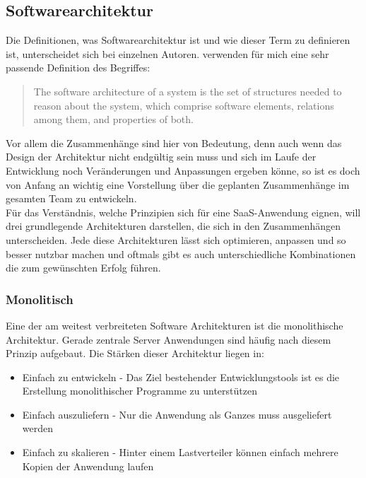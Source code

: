 \subsection{Softwarearchitektur}
Die Definitionen, was Softwarearchitektur ist und wie dieser Term zu definieren ist, unterscheidet sich bei einzelnen Autoren. \citet*[S. 4]{Bass.2013} verwenden für mich eine sehr passende Definition des Begriffes:
	\begin{quote} 
	The software architecture of a system is the set of structures needed to reason about the system, which comprise software elements, relations among them, and properties of both.
	 \end{quote}
Vor allem die Zusammenhänge sind hier von Bedeutung, denn auch wenn das Design der Architektur nicht endgültig sein muss und sich im Laufe der Entwicklung noch Veränderungen und Anpassungen ergeben könne, so ist es doch von Anfang an wichtig eine Vorstellung über die geplanten Zusammenhänge im gesamten Team zu entwickeln.\\
Für das Verständnis, welche Prinzipien sich für eine SaaS-Anwendung eignen, will drei grundlegende Architekturen darstellen, die sich in den Zusammenhängen unterscheiden. Jede diese Architekturen lässt sich optimieren, anpassen und so besser nutzbar machen und oftmals gibt es auch unterschiedliche Kombinationen die zum gewünschten Erfolg führen.
	\subsubsection{Monolitisch}
	Eine der am weitest verbreiteten Software Architekturen ist die monolithische Architektur. Gerade zentrale Server Anwendungen sind häufig nach diesem Prinzip aufgebaut. Die Stärken dieser Architektur liegen in:
	\begin{itemize}
	\item Einfach zu entwickeln - Das Ziel bestehender Entwicklungstools ist es die Erstellung monolithischer Programme zu unterstützen 
	\item Einfach auszuliefern - Nur die Anwendung als Ganzes muss ausgeliefert werden
	\item Einfach zu skalieren - Hinter einem Lastverteiler können einfach mehrere Kopien der Anwendung laufen
	\end{itemize}
	
